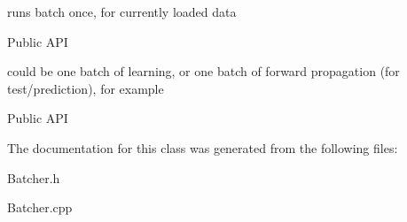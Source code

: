 runs batch once, for currently loaded data 

\begin{DoxyParagraph}{Public A\-P\-I}

\end{DoxyParagraph}
could be one batch of learning, or one batch of forward propagation (for test/prediction), for example \begin{DoxyParagraph}{Public A\-P\-I}

\end{DoxyParagraph}


The documentation for this class was generated from the following files\-:\begin{DoxyCompactItemize}
\item 
Batcher.\-h\item 
Batcher.\-cpp\end{DoxyCompactItemize}
